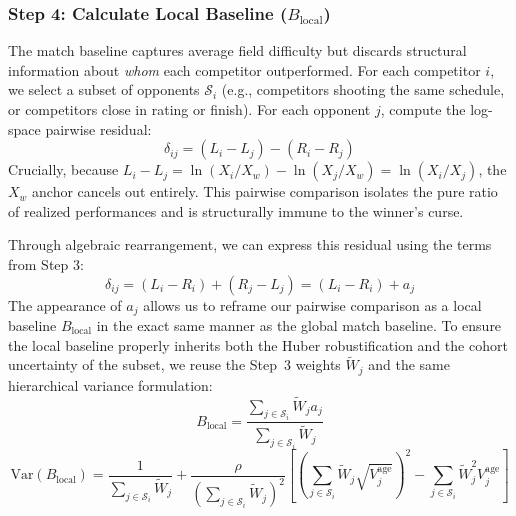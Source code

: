 \documentclass[12pt]{article}
\newcommand{\xwin}{X_w}
\begin{document}
	\subsubsection*{Step 4: Calculate Local Baseline ($B_{\mathrm{local}}$)}
	The match baseline captures average field difficulty but discards structural information about \textit{whom} each competitor outperformed. For each competitor $i$, we select a subset of opponents $\mathcal{S}_i$ (e.g., competitors shooting the same schedule, or competitors close in rating or finish). For each opponent $j$, compute the log-space pairwise residual:
	\begin{equation}
		\delta_{ij} = (L_i - L_j) - (R_i - R_j)
	\end{equation}
	Crucially, because $L_i - L_j = \ln(X_i/\xwin) - \ln(X_j/\xwin) = \ln(X_i/X_j)$, the $\xwin$ anchor cancels out entirely. This pairwise comparison isolates the pure ratio of realized performances and is structurally immune to the winner's curse.

	Through algebraic rearrangement, we can express this residual using the terms from Step 3:
	\begin{equation}
		\delta_{ij} = (L_i - R_i) + (R_j - L_j) = (L_i - R_i) + a_j
	\end{equation}
	The appearance of $a_j$ allows us to reframe our pairwise comparison as a local baseline $B_{\mathrm{local}}$ in the exact same manner as the global match baseline. To ensure the local baseline properly inherits both the Huber robustification and the cohort uncertainty of the subset, we reuse the Step~3 weights $\tilde{W}_j$ and the same hierarchical variance formulation:
	\begin{equation}
		B_{\mathrm{local}} = \frac{\sum_{j \in \mathcal{S}_i} \tilde{W}_j a_j}{\sum_{j \in \mathcal{S}_i} \tilde{W}_j}
	\end{equation}
	\begin{equation}
		\mathrm{Var}(B_{\mathrm{local}}) = \frac{1}{\sum_{j \in \mathcal{S}_i} \tilde{W}_j} + \frac{\rho}{\left(\sum_{j \in \mathcal{S}_i} \tilde{W}_j\right)^2} \left[ \left( \sum_{j \in \mathcal{S}_i} \tilde{W}_j \sqrt{V_j^{\mathrm{age}}} \right)^2 - \sum_{j \in \mathcal{S}_i} \tilde{W}_j^2 V_j^{\mathrm{age}} \right]
	\end{equation}
\end{document}
